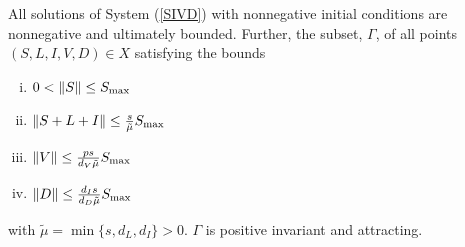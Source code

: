 \documentclass{CMHPhD-SIVD}
\begin{document}

\begin{proposition}  All solutions of System (\ref{SIVD}) with nonnegative initial conditions are nonnegative and ultimately bounded.  
	Further, the subset, $\Gamma$, of all points $(S, L, I, V, D) \in X$ satisfying the bounds

\begin{enumerate}[(i)]
	\item $0<\|S\|\leq S_{\text{max}}$
	\item $\|S+L+I\|\leq\frac{s}{\tilde{\mu}} S_{\text{max}}$
	\item $\|V\|\leq\frac{ p s}{d_V\tilde{\mu}} S_{\text{max}}$
	\item $\|D\|\leq\frac{d_I s}{d_D\tilde{\mu}} S_{\text{max}}$
\end{enumerate}
with $\tilde{\mu}=\min\{s,d_L,d_I\}>0$. $\Gamma$ is positive invariant and attracting.
\end{proposition}
\end{document}
